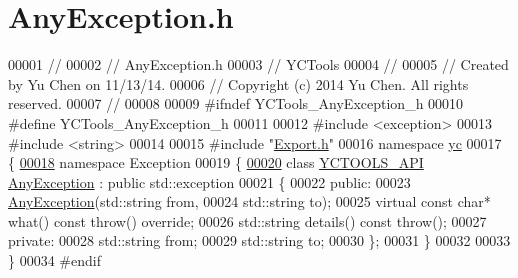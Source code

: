 \hypertarget{_any_exception_8h_source}{}\section{Any\+Exception.\+h}
\label{_any_exception_8h_source}

\begin{DoxyCode}
00001 \textcolor{comment}{//}
00002 \textcolor{comment}{//  AnyException.h}
00003 \textcolor{comment}{//  YCTools}
00004 \textcolor{comment}{//}
00005 \textcolor{comment}{//  Created by Yu Chen on 11/13/14.}
00006 \textcolor{comment}{//  Copyright (c) 2014 Yu Chen. All rights reserved.}
00007 \textcolor{comment}{//}
00008 
00009 \textcolor{preprocessor}{#ifndef YCTools\_AnyException\_h}
00010 \textcolor{preprocessor}{#define YCTools\_AnyException\_h}
00011 
00012 \textcolor{preprocessor}{#include <exception>}
00013 \textcolor{preprocessor}{#include <string>}
00014 
00015 \textcolor{preprocessor}{#include "\hyperlink{yctools_2_export_8h}{Export.h}"}
00016 \textcolor{keyword}{namespace }\hyperlink{namespaceyc}{yc}
00017 \{
\hypertarget{_any_exception_8h_source_l00018}{}\hyperlink{namespaceyc_1_1_exception}{00018}     \textcolor{keyword}{namespace }Exception
00019     \{
\hypertarget{_any_exception_8h_source_l00020}{}\hyperlink{classyc_1_1_exception_1_1_any_exception}{00020}         \textcolor{keyword}{class }\hyperlink{yctools_2_export_8h_aa9bd63af2d697c3f5d9ee84516c21762}{YCTOOLS\_API} \hyperlink{classyc_1_1_exception_1_1_any_exception}{AnyException} : \textcolor{keyword}{public} std::exception
00021         \{
00022         \textcolor{keyword}{public}:
00023             \hyperlink{classyc_1_1_exception_1_1_any_exception}{AnyException}(std::string from,
00024                          std::string to);
00025             \textcolor{keyword}{virtual} \textcolor{keyword}{const} \textcolor{keywordtype}{char}* what() \textcolor{keyword}{const} \textcolor{keywordflow}{throw}() \textcolor{keyword}{override};
00026             std::string details() \textcolor{keyword}{const} \textcolor{keywordflow}{throw}();
00027         \textcolor{keyword}{private}:
00028             std::string from;
00029             std::string to;
00030         \};
00031     \}
00032     
00033 \}
00034 \textcolor{preprocessor}{#endif}
\end{DoxyCode}
